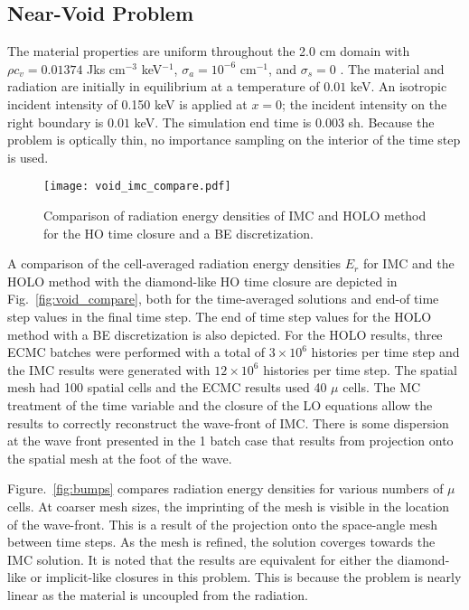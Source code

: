 \subsection{Near-Void Problem}

 The material properties
are uniform throughout the 2.0 cm domain with $\rho c_v = 0.01374$ Jks cm$^{-3}$ keV$^{-1}$, $\sigma_a=10^{-6}$ cm$^{-1}$, and $\sigma_s=0$ \invcm.
The material and radiation are initially in equilibrium at a temperature of $0.01$ keV.  An isotropic incident intensity of 0.150 keV is applied
at $x=0$; the incident intensity on the right boundary is $0.01$ keV.  The simulation end
time is 0.003 sh.  Because the problem is optically thin, no importance sampling on the
interior of the time step is used.  
\begin{figure}[H]
  \centering
    \texttt{[image: void\_imc\_compare.pdf]}
    \caption{\label{fig:void_imc_compare} Comparison of radiation energy densities of IMC
    and HOLO method for the HO time closure and a BE discretization.}
\end{figure}

A comparison of the cell-averaged radiation energy densities $E_r$ for IMC and the HOLO
method with the diamond-like HO time closure are depicted in Fig.~\ref{fig:void_compare},
both for the time-averaged solutions and end-of time step values in the final time step.
The end of time step values for the HOLO method with a BE discretization is also depicted.
For the HOLO results, three ECMC batches were performed with
a total of $3\times10^6$ histories per time step and the IMC results were generated with
$12\times10^6$ histories per time step.  The spatial mesh had 100 spatial cells and the
ECMC results used 40 $\mu$ cells.  
The MC treatment of the time
variable and the closure of the LO equations allow the results to correctly reconstruct
the wave-front of IMC.  There is some dispersion at the wave front presented in the 1
batch case that results from projection onto the spatial mesh at the foot of the wave.

Figure.~\ref{fig:bumps} compares radiation energy densities for various numbers of $\mu$
cells.  At coarser mesh sizes, the imprinting of the mesh is visible in the location of
the wave-front.  This is a result of the projection onto the space-angle mesh between time
steps.  As the mesh is refined, the solution coverges towards the IMC solution.  It is
noted that the results are equivalent for either the diamond-like or implicit-like
closures in this problem.  This is because the problem is nearly linear as the material is
uncoupled from the radiation.  

